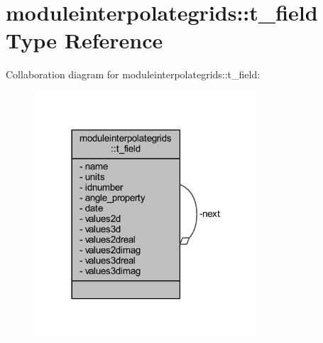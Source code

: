 \hypertarget{structmoduleinterpolategrids_1_1t__field}{}\section{moduleinterpolategrids\+:\+:t\+\_\+field Type Reference}
\label{structmoduleinterpolategrids_1_1t__field}


Collaboration diagram for moduleinterpolategrids\+:\+:t\+\_\+field\+:\nopagebreak
\begin{figure}[H]
\begin{center}
\leavevmode
\includegraphics[width=237pt]{structmoduleinterpolategrids_1_1t__field__coll__graph}
\end{center}
\end{figure}
